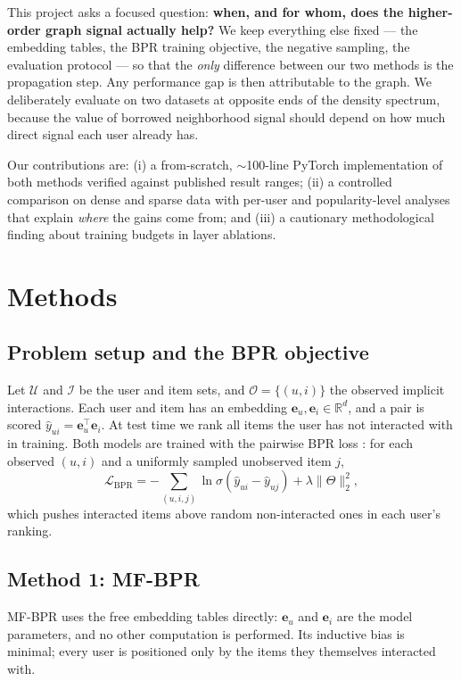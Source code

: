 \documentclass[11pt]{article}
\begin{document}
This project asks a focused question: \textbf{when, and for whom, does the
higher-order graph signal actually help?} We keep everything else fixed ---
the embedding tables, the BPR training objective, the negative sampling, the
evaluation protocol --- so that the \emph{only} difference between our two
methods is the propagation step. Any performance gap is then attributable to
the graph. We deliberately evaluate on two datasets at opposite ends of the
density spectrum, because the value of borrowed neighborhood signal should
depend on how much direct signal each user already has.

Our contributions are: (i) a from-scratch, $\sim$100-line PyTorch
implementation of both methods verified against published result ranges;
(ii) a controlled comparison on dense and sparse data with per-user and
popularity-level analyses that explain \emph{where} the gains come from; and
(iii) a cautionary methodological finding about training budgets in layer
ablations.

\section{Methods}

\subsection{Problem setup and the BPR objective}

Let $\mathcal{U}$ and $\mathcal{I}$ be the user and item sets, and
$\mathcal{O}=\{(u,i)\}$ the observed implicit interactions. Each user and item
has an embedding $\mathbf{e}_u,\mathbf{e}_i\in\mathbb{R}^d$, and a pair is
scored $\hat y_{ui}=\mathbf{e}_u^\top\mathbf{e}_i$. At test time we rank all
items the user has not interacted with in training. Both models are trained
with the pairwise BPR loss \cite{bpr}: for each observed $(u,i)$ and a uniformly sampled
unobserved item $j$,
\begin{equation}
\mathcal{L}_{\mathrm{BPR}}
= -\!\!\sum_{(u,i,j)}\!\ln\sigma\!\left(\hat y_{ui}-\hat y_{uj}\right)
+ \lambda\lVert\Theta\rVert_2^2 ,
\end{equation}
which pushes interacted items above random non-interacted ones in each user's
ranking.

\subsection{Method 1: MF-BPR}

MF-BPR uses the free embedding tables directly: $\mathbf{e}_u$ and
$\mathbf{e}_i$ are the model parameters, and no other computation is
performed. Its inductive bias is minimal; every user is positioned only by the
items they themselves interacted with.
\end{document}
